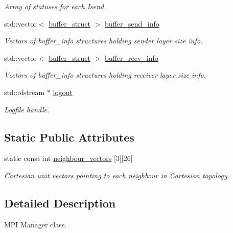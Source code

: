 \begin{DoxyCompactItemize}
\begin{DoxyCompactList}\small\item\em Array of statuses for each Isend. \end{DoxyCompactList}\item 
std\+::vector$<$ \hyperlink{struct_mpi_manager_1_1buffer__struct}{buffer\+\_\+struct} $>$ \hyperlink{class_mpi_manager_a3a91c2e8cfb15027a0681c198f82d257}{buffer\+\_\+send\+\_\+info}
\begin{DoxyCompactList}\small\item\em Vectors of buffer\+\_\+info structures holding sender layer size info. \end{DoxyCompactList}\item 
std\+::vector$<$ \hyperlink{struct_mpi_manager_1_1buffer__struct}{buffer\+\_\+struct} $>$ \hyperlink{class_mpi_manager_a5e769fa077d24d62d10a9a0d303009d1}{buffer\+\_\+recv\+\_\+info}
\begin{DoxyCompactList}\small\item\em Vectors of buffer\+\_\+info structures holding receiver layer size info. \end{DoxyCompactList}\item 
std\+::ofstream $\ast$ \hyperlink{class_mpi_manager_a9a0dd93f57d78f568048197c95311832}{logout}
\begin{DoxyCompactList}\small\item\em Logfile handle. \end{DoxyCompactList}\end{DoxyCompactItemize}
\subsection*{Static Public Attributes}
\begin{DoxyCompactItemize}
\item 
static const int \hyperlink{class_mpi_manager_a0c5f58ce12a1a8002cb124bf61e80d09}{neighbour\+\_\+vectors} \mbox{[}3\mbox{]}\mbox{[}26\mbox{]}
\begin{DoxyCompactList}\small\item\em Cartesian unit vectors pointing to each neighbour in Cartesian topology. \end{DoxyCompactList}\end{DoxyCompactItemize}


\subsection{Detailed Description}
M\+PI Manager class. 

